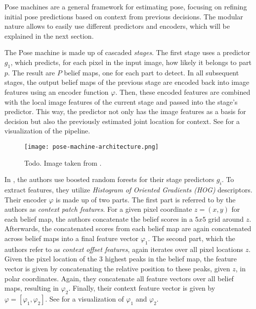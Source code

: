 Pose machines are a general framework for estimating pose, focusing on refining initial pose predictions based on context from previous decisions.
The modular nature allows to easily use different predictors and encoders, which will be explained in the next section.

The Pose machine is made up of cascaded \textit{stages}.
The first stage uses a predictor $g_1$, which predicts, for each pixel in the input image, how likely it belongs to part $p$.
The result are $P$ belief maps, one for each part to detect.
In all subsequent stages, the output belief maps of the previous stage are encoded back into image features using an encoder function $\varphi$.
Then, these encoded features are combined with the local image features of the current stage and passed into the stage's predictor.
This way, the predictor not only has the image features as a basis for decision but also the previously estimated joint location for context.
See  for a visualization of the pipeline.

\begin{figure}[htb!]
    \centering
    \texttt{[image: pose-machine-architecture.png]}
    \caption{Todo. Image taken from \cite{wei_convolutional_2016}.}
    \label{fig:pose-machines-architecture}
\end{figure}

In \cite{ramakrishna_pose_2014}, the authors use boosted random forests for their stage predictors $g_i$.
To extract features, they utilize \textit{Histogram of Oriented Gradients (HOG)} descriptors.
Their encoder $\varphi$ is made up of two parts.
The first part is referred to by the authors as \textit{context patch features}.
For a given pixel coordinate $z = (x, y)$ for each belief map, the authors concatenate the belief scores in a $5 x 5$ grid around $z$.
Afterwards, the concatenated scores from each belief map are again concatenated across belief maps into a final feature vector $\varphi_1$.
The second part, which the authors refer to as \textit{context offset features}, again iterates over all pixel locations $z$.
Given the pixel location of the $3$ highest peaks in the belief map, the feature vector is given by concatenating the relative position to these peaks, given $z$, in polar coordinates.
Again, they concatenate all feature vectors over all belief maps, resulting in $\varphi_2$.
Finally, their context feature vector is given by $\varphi = [\varphi_1, \varphi_2]$.
See  for a visualization of $\varphi_1$ and $\varphi_2$.

